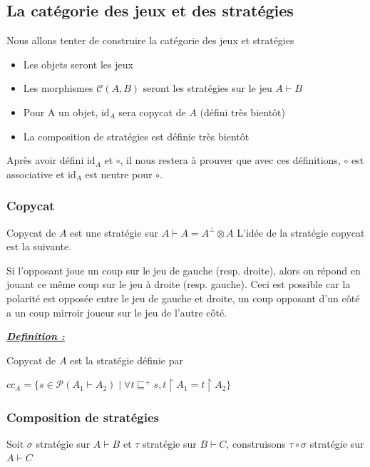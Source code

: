 \documentclass[a4paper,12pt]{article}
\renewenvironment{leftbar}{
  \def\FrameCommand{\vrule width 1pt \hspace{10pt}}
  \MakeFramed {\advance\hsize-\width \FrameRestore}
\setlength{\parskip}{10pt}}
 {\endMakeFramed}
\newenvironment{answer}[1]
{
  \vspace{0.5cm} \noindent \begin{minipage}{\linewidth}
    \textbf{\textit{\uline{#1}}}
    \begin{leftbar}
}
{
    \end{leftbar}\end{minipage}\vspace{0.2cm}
}
\begin{document}
\subsection{La catégorie des jeux et des stratégies}

Nous allons tenter de construire la catégorie des jeux et stratégies

\begin{itemize}
\item Les objets seront les jeux
\item Les morphismes $\mathcal{C}(A,B)$ seront les stratégies sur le jeu $A \vdash B$
\item Pour A un objet, $\text{id}_A$ sera copycat de $A$ (défini très bientôt)
\item La composition de stratégies est définie très bientôt
\end{itemize}

Après avoir défini $\text{id}_A$ et $\circ$, il nous restera à prouver
que avec ces définitions, $\circ$ est associative et $\text{id}_A$ est neutre
pour $\circ$.

\subsubsection{Copycat}

Copycat de $A$ est une stratégie sur $A \vdash A = A^\bot \otimes A$
L'idée de la stratégie copycat est la suivante.

Si l'opposant joue un coup sur le jeu de gauche (resp. droite), alors on répond
en jouant ce même coup sur le jeu à droite (resp. gauche). Ceci est possible car
la polarité est opposée entre le jeu de gauche et droite,
un coup opposant d'un côté a un coup mirroir joueur sur le jeu de l'autre côté.

\begin{answer}{Definition :}
Copycat de $A$ est la stratégie définie par

$cc_A=\{s \in \mathcal{P}(A_1 \vdash A_2) \mid \forall t \sqsubseteq^+ s, t \upharpoonright A_1 = t \upharpoonright A_2\}$
\end{answer}


\subsubsection{Composition de stratégies}

Soit $\sigma$ stratégie sur $A\vdash B$ et $\tau$ stratégie sur $B \vdash C$,
construisons $\tau \circ \sigma$ stratégie sur $A \vdash C$
\end{document}
